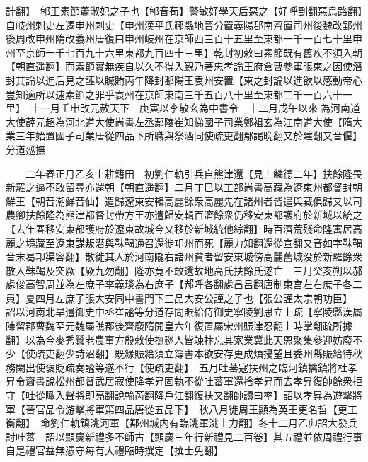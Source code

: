 計翻】　郇王素節蕭淑妃之子也【郇音荀】警敏好學天后惡之【好呼到翻惡烏路翻】自岐州刺史左遷申州刺史【申州漢平氏鄳縣地晉分置義陽郡南齊置司州後魏改郢州後周改申州隋改義州唐復曰申州岐州在京師西三百十五里至東都一千一百七十里申州至京師一千七百九十六里東都九百四十三里】乾封初敕曰素節既有舊疾不須入朝【朝直遥翻】而素節實無疾自以久不得入覲乃著忠孝論王府倉曹參軍張柬之因使濳封其論以進后見之誣以贓賄丙午降封鄱陽王袁州安置【東之封論以進欲以感動帝心豈知適所以速素節之罪乎袁州在京師東南三千五百八十里至東都二千一百六十一里】　十一月壬申改元赦天下　庚寅以李敬玄為中書令　十二月戊午以來為河南道大使薛元超為河北道大使尚書左丞鄢陵崔知悌國子司業鄭祖玄為江南道大使【隋大業三年始置國子司業唐從四品下所職與祭酒同使疏吏翻鄢謁晩翻又於建翻又音偃】分道廵撫

　　二年春正月乙亥上耕籍田　初劉仁軌引兵自熊津還【見上麟德二年】扶餘隆畏新羅之逼不敢留尋亦還朝【朝直遥翻】二月丁巳以工部尚書高藏為遼東州都督封朝鮮王【朝音潮鮮音仙】遣歸遼東安輯高麗餘衆高麗先在諸州者皆遣與藏俱歸又以司農卿扶餘隆為熊津都督封帶方王亦遣歸安輯百濟餘衆仍移安東都護府於新城以統之【去年春移安東都護府於遼東故城今又移於新城統他綜翻】時百濟荒殘命隆寓居高麗之境藏至遼東謀叛潜與靺鞨通召還徙卭州而死【麗力知翻還從宣翻又音如字靺鞨音末曷卭渠容翻】散徙其人於河南隴右諸州貧者留安東城傍高麗舊城没於新羅餘衆散入靺鞨及突厥【厥九勿翻】隆亦竟不敢還故地高氏扶餘氏遂亡　三月癸亥朔以郝處俊高智周並為左庶子李義琰為右庶子【郝呼各翻處昌呂翻唐制東宫左右庶子各二員】夏四月左庶子張大安同中書門下三品大安公謹之子也【張公謹太宗朝功臣】　詔以河南北旱遣御史中丞崔謐等分道存問賑給侍御史寧陵劉思立上疏【寧陵縣漢屬陳留郡曹魏至元魏屬譙郡後齊廢隋開皇六年復置屬宋州賑津忍翻上時掌翻疏所據翻】以為今麥秀蠶老農事方殷敕使撫廵人皆竦抃忘其家業冀此天恩聚集參迎妨廢不少【使疏吏翻少詩沼翻】既緣賑給須立簿書本欲安存更成煩擾望且委州縣賑給待秋務閑出使褒貶疏奏謐等遂不行【使疏吏翻】　五月吐蕃寇扶州之臨河鎮擒鎮將杜孝昇令齎書說松州都督武居寂使降孝昇固執不從吐蕃軍還捨孝昇而去孝昇復帥餘衆拒守【吐從瞰入聲將即亮翻說輸芮翻降戶江翻復扶又翻帥讀曰率】詔以孝昇為遊擊將軍【晉官品令游擊將軍第四品唐從五品下】　秋八月徙周王顯為英王更名哲【更工衡翻】　命劉仁軌鎮洮河軍【鄯州城内有臨洮軍洮土力翻】冬十二月乙卯詔大發兵討吐蕃　詔以顯慶新禮多不師古【顯慶三年行新禮見二百卷】其五禮並依周禮行事自是禮官益無憑守每有大禮臨時撰定【撰士免翻】

